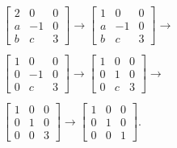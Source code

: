 \documentclass[12pt]{article}
\begin{document}
\begin{enumerate}
      \begin{align*}
        \begin{bmatrix}
          2 &  0 & 0\\
          a & -1 & 0\\
          b &  c & 3
        \end{bmatrix}
        \xrightarrow{}
        \begin{bmatrix}
          1 &  0 & 0\\
          a & -1 & 0\\
          b &  c & 3
        \end{bmatrix}
        \xrightarrow{}\\\\
        \begin{bmatrix}
          1 &  0 & 0\\
          0 & -1 & 0\\
          0 &  c & 3
        \end{bmatrix}
        \xrightarrow{}
        \begin{bmatrix}
          1 &  0 & 0\\
          0 &  1 & 0\\
          0 &  c & 3
        \end{bmatrix}
        \xrightarrow{}\\\\
        \begin{bmatrix}
          1 &  0 & 0\\
          0 &  1 & 0\\
          0 &  0 & 3
        \end{bmatrix}
        \xrightarrow{}
        \begin{bmatrix}
          1 &  0 & 0\\
          0 &  1 & 0\\
          0 &  0 & 1
        \end{bmatrix}.
      \end{align*}


\end{enumerate}
\end{document}
